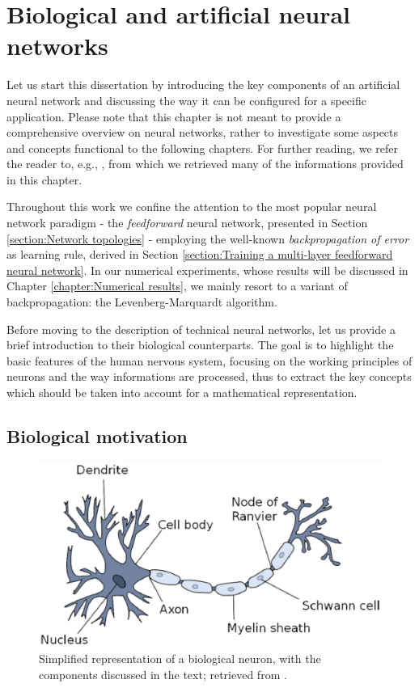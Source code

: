 \documentclass[12pt, a4paper, twoside, openright, notitlepage]{report}
\numberwithin{equation}{chapter}
\theoremstyle{theorem}
\theoremstyle{definition}
\theoremstyle{remark}
\theoremstyle{proposition}
\numberwithin{figure}{chapter}
\begin{document}
	\chapter{Biological and artificial neural networks}
	\label{chapter:Introduction to neural networks}
	
		Let us start this dissertation by introducing the key components of an artificial neural network and discussing the way it can be configured for a specific application. Please note that this chapter is not meant to provide a comprehensive overview on neural networks, rather to investigate some aspects and concepts functional to the following chapters. For further reading, we refer the reader to, e.g., \cite{Hag14, Hay05, Kri07}, from which we retrieved many of the informations provided in this chapter.
		
		Throughout this work we confine the attention to the most popular neural network paradigm - the \emph{feedforward} neural network, presented in Section \ref{section:Network topologies} - employing the well-known \emph{backpropagation of error} as learning rule, derived in Section \ref{section:Training a multi-layer feedforward neural network}. In our numerical experiments, whose results will be discussed in Chapter \ref{chapter:Numerical results}, we mainly resort to a variant of backpropagation: the Levenberg-Marquardt algorithm.
		
		Before moving to the description of technical neural networks, let us provide a brief introduction to their biological counterparts. The goal is to highlight the basic features of the human nervous system, focusing on the working principles of neurons and the way informations are processed, thus to extract the key concepts which should be taken into account for a mathematical representation.
		
	\vspace*{0.3cm} 
		
	\section{Biological motivation}
	\label{section:Biological motivation} 
	
		\begin{figure}[t]
			\center
			\includegraphics[scale = 0.5]{neuron.eps}
			
			\caption{Simplified representation of a biological neuron, with the components discussed in the text; retrieved from \cite{Kri07}.}
			\label{fig:neuron}
		\end{figure}
		
\end{document}
